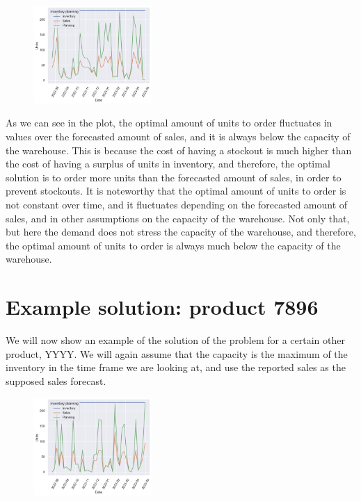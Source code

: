\documentclass{OptiFlow}
\begin{document}
\begin{figure}[htpb]
	\centering
	\includegraphics[width=0.4\textwidth]{25662.png}
	\label{fig:graf1}
\end{figure}

As we can see in the plot, the optimal amount of units to order 
fluctuates in values over the forecasted amount of sales, and it is always below the capacity of the warehouse.
This is because the cost of having a stockout is much higher than the cost of having a surplus of units in inventory,
and therefore, the optimal solution is to order more units than the forecasted amount of sales, in order to prevent stockouts.
It is noteworthy that the optimal amount of units to order is not constant over time, and it fluctuates depending on the
forecasted amount of sales, and in other assumptions on the capacity of the warehouse. Not only that,
but here the demand does not stress the capacity of the warehouse, and therefore, the optimal amount of units to order is always much below the capacity of the warehouse.

\section{Example solution: product 7896}
We will now show an example of the solution of the problem for a certain other product, YYYY.
We will again assume that the capacity is the maximum of the inventory in the time frame we are looking at, and use the reported sales 
as the supposed sales forecast.

\begin{figure}[htpb]
	\centering
	\includegraphics[width=0.4\textwidth]{7896.png}
	\label{fig:graf2}
\end{figure}
\end{document}
